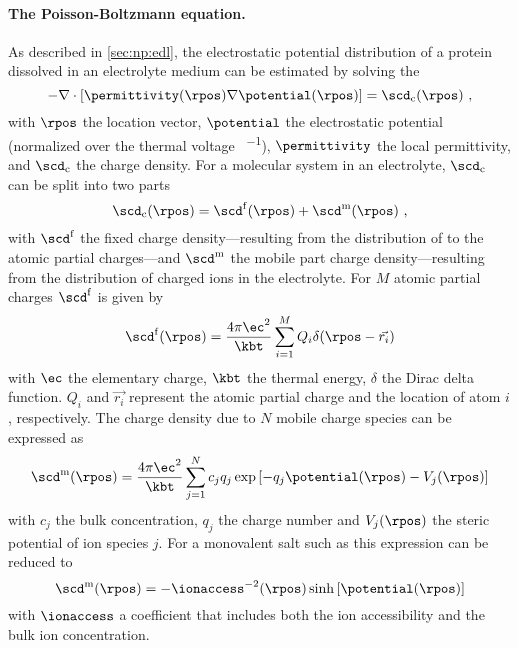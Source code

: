 \paragraph{The Poisson-Boltzmann equation.}
%
As described in \cref{sec:np:edl}, the electrostatic potential distribution of a protein dissolved in an
electrolyte medium can be estimated by solving the ~\cite{Baker-2001,Baker-2005}
%
\begin{equation}\label{eq:pbe}
  - \nabla \cdot \left[ \permittivity (\rpos) \nabla \potential (\rpos) \right] = \scd_{\rm{c}} (\rpos)
  \text{ ,}
\end{equation}
%
with $\rpos$ the location vector, $\potential$ the electrostatic potential (normalized over the thermal
voltage \si{\kbt\per\ec}), $\permittivity$ the local permittivity, and $\scd_{\rm{c}}$ the charge density. For
a molecular system in an electrolyte, $\scd_{\rm{c}}$ can be split into two parts
%
\begin{equation}
  \scd_{\rm{c}} (\rpos) = \scd^{\rm{f}}(\rpos) + \scd^{\rm{m}}(\rpos)
  \text{ ,}
\end{equation}
%
with $\scd^{\rm{f}}$ the fixed charge density---resulting from the distribution of to the atomic partial
charges---and $\scd^{\rm{m}}$ the mobile part charge density---resulting from the distribution of charged ions
in the electrolyte. For $M$ atomic partial charges $\scd^{\rm{f}}$ is given by~\cite{Baker-2001,Baker-2005}
%
\begin{equation}
  \scd^{\rm{f}} (\rpos) = \dfrac{4\pi\ec^2}{\kbt} \sum_{i=1}^{M} Q_i \delta(\rpos - \vec{r_i})
\end{equation}
%
with $\ec$ the elementary charge, $\kbt$ the thermal energy, $\delta$ the Dirac delta function. $Q_i$ and
$\vec{r_i}$ represent the atomic partial charge and the location of atom $i$, respectively. The charge density
due to $N$ mobile charge species can be expressed as~\cite{Baker-2001,Baker-2005}
%
\begin{equation}
  \scd^{\rm{m}}(\rpos) =
    \dfrac{4\pi\ec^2}{\kbt}
      \sum_{j=1}^{N} c_j q_j
      \exp{\left[- q_j \potential(\rpos) - V_j(\rpos) \right]}
\end{equation}
%
with $c_j$ the bulk concentration, $q_j$ the charge number and $V_j(\rpos)$ the steric potential of ion
species $j$. For a monovalent salt such as  this expression can be reduced to
%
\begin{equation}
    \scd^{\rm{m}} (\rpos) = - \ionaccess^{-2} (\rpos) \sinh \left[ \potential (\rpos) \right]
\end{equation}
%
with $\ionaccess$ a coefficient that includes both the ion accessibility and the bulk ion concentration.

